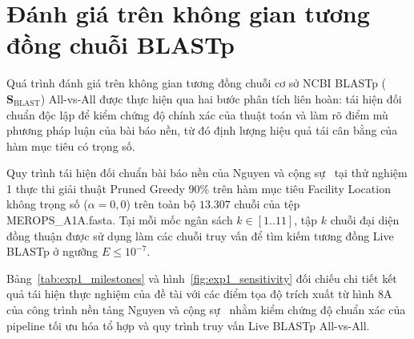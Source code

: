 \section{Đánh giá trên không gian tương đồng chuỗi BLASTp}
\label{sec:blast_evaluation}
\label{sec:branch_1}
\label{subsec:branch1_protocol}
\label{subsec:branch1_results}
\label{subsec:branch1_flaws}

Quá trình đánh giá trên không gian tương đồng chuỗi cơ sở NCBI BLASTp ($\mathbf{S}_{\text{BLAST}}$) All-vs-All được thực hiện qua hai bước phân tích liên hoàn: tái hiện đối chuẩn độc lập để kiểm chứng độ chính xác của thuật toán và làm rõ điểm mù phương pháp luận của bài báo nền, từ đó định lượng hiệu quả tái cân bằng của hàm mục tiêu có trọng số.

Quy trình tái hiện đối chuẩn bài báo nền của Nguyen và cộng sự~\cite{nguyen2025} tại thử nghiệm 1 thực thi giải thuật Pruned Greedy 90\% trên hàm mục tiêu Facility Location không trọng số ($\alpha = 0{,}0$) trên toàn bộ $13.307$ chuỗi của tệp MEROPS\_A1A.fasta. Tại mỗi mốc ngân sách $k \in [1..11]$, tập $k$ chuỗi đại diện đồng thuận được sử dụng làm các chuỗi truy vấn để tìm kiếm tương đồng Live BLASTp ở ngưỡng $E \le 10^{-7}$.

Bảng~\ref{tab:exp1_milestones} và hình~\ref{fig:exp1_sensitivity} đối chiếu chi tiết kết quả tái hiện thực nghiệm của đề tài với các điểm tọa độ trích xuất từ hình 8A của công trình nền tảng Nguyen và cộng sự~\cite{nguyen2025} nhằm kiểm chứng độ chuẩn xác của pipeline tối ưu hóa tổ hợp và quy trình truy vấn Live BLASTp All-vs-All.

